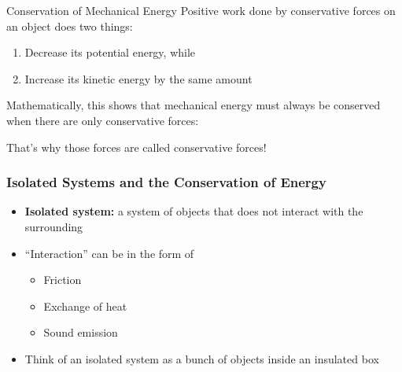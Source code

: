 \documentclass[12pt,compress,aspectratio=169]{beamer}
\newcommand{\eq}[2]{\vspace{#1}{\Large\begin{displaymath}#2\end{displaymath}}}
\begin{document}
\begin{frame}{Conservation of Mechanical Energy}
  Positive work done by conservative forces on an object does two things:
  \begin{enumerate}[1.]
  \item Decrease its potential energy, while
  \item Increase its kinetic energy by the same amount
  \end{enumerate}
  Mathematically, this shows that mechanical energy must always be conserved
  when there are only conservative forces:

  \eq{-.15in}{
    W=-\Delta U = \Delta K \quad\longrightarrow\quad
    \boxed{\Delta K + \Delta U =0}
  }

  That's why those forces are called conservative forces!
\end{frame}



%
%
%  
%
%




\begin{frame}
  \frametitle{Isolated Systems and the Conservation of Energy}
  \begin{itemize}
  \item\textbf{Isolated system:} a system of objects that does not interact with
    the surrounding
  \item ``Interaction'' can be in the form of
    \begin{itemize}
    \item Friction
    \item Exchange of heat
    \item Sound emission
    \end{itemize}
  \item Think of an isolated system as a bunch of objects inside an insulated
    box
  \end{itemize}
  \begin{center}
  \end{center}
\end{frame}
\end{document}
